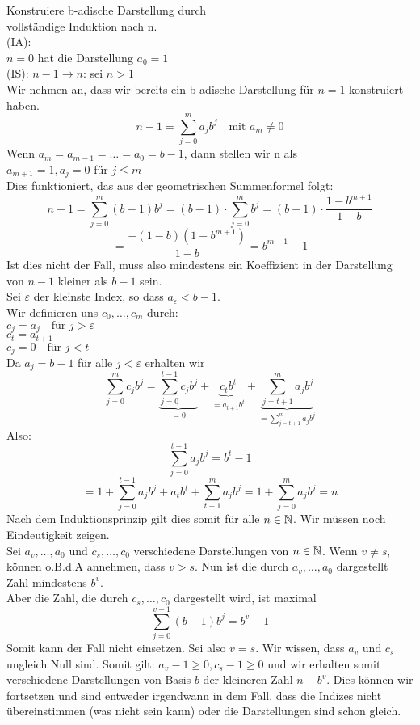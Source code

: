 \documentclass[../ana1u.tex]{subfiles}
\begin{document}
\begin{bew}
    Konstruiere b-adische Darstellung durch \\
    vollständige Induktion nach n. \\
    (IA):\\
    \(n = 0\) hat die Darstellung \(a_0 = 1 \) \\
    (IS): \(n - 1 \rightarrow n\): sei \(n > 1 \) \\
    Wir nehmen an, dass wir bereits ein b-adische Darstellung für \(n = 1 \) konstruiert haben.
    \[n-1 = \sum_{j=0}^{m} a_jb^j \quad \text{mit } a_m \neq 0 \]
    Wenn \(a_m = a_{m-1} = \dots = a_0 = b-1\), dann stellen wir n als \\
    \(a_{m+1} = 1, a_j = 0\) für \(j \leq m \) \\
    Dies funktioniert, das aus der geometrischen Summenformel folgt:
    \[n-1 = \sum_{j=0}^{m} (b-1)b^j = (b-1) \cdot \sum_{j=0}^{m}b^j = (b-1) 
    \cdot \frac{1- b^{m+1}}{1-b} \]
    \[= \frac{-(1-b)(1-b^{m+1})}{1-b} = b^{m+1}-1 \]
    Ist dies nicht der Fall, muss also mindestens ein Koeffizient in der Darstellung von 
    \(n-1\) kleiner als \(b-1\) sein. \\
    Sei \(\varepsilon\) der kleinste Index, so dass \(a_{\varepsilon} < b-1\). \\
    Wir definieren uns \(c_0, \dots, c_m \) durch: \\
    \(c_j = a_j \quad \text{für } j > \varepsilon \) \\
    \(c_t = a_{t+1}\) \\
    \(c_j = 0 \quad \text{für } j < t\) \\
    Da \(a_j = b-1\) für alle \(j<\varepsilon\) erhalten wir
    \[\sum_{j=0}^{m} c_jb^j = \underbrace{\sum_{j=0}^{t-1} c_jb^j}_{=0} 
    + \underbrace{c_tb^t}_{=a_{t+1}b^t} + 
    \underbrace{\sum_{j=t+1}^{m} a_jb^j}_{=\sum_{j=t+1}^{m} a_jb^j} \]
    Also:
    \[\sum_{j=0}^{t-1} a_jb^j = b^t-1 \]
    \[= 1+\sum_{j=0}^{t-1} a_jb^j + a_tb^t + \sum_{t+1}^{m}a_jb^j 
    = 1+\sum_{j=0}^{m} a_jb^j = n \]
    Nach dem Induktionsprinzip gilt dies somit für alle \(n \in \mathbb{N} \). Wir müssen noch 
    Eindeutigkeit zeigen. \\
    Sei \(a_v,\dots, a_0 \) und \(c_s,\dots, c_0 \) verschiedene Darstellungen von 
    \(n \in \mathbb{N} \). 
    Wenn \(v \neq s \), können o.B.d.A annehmen, dass \(v > s\). Nun ist die durch 
    \(a_v,\dots, a_0 \) dargestellt Zahl mindestens \(b^v \). \\
    Aber die Zahl, die durch \(c_s,\dots, c_0\) dargestellt wird, ist maximal
    \[\sum_{j=0}^{v-1}(b-1)b^j = b^v - 1\]
    Somit kann der Fall nicht einsetzen. Sei also \(v=s\). Wir wissen, dass \(a_v\) und 
    \(c_s\) ungleich Null sind. Somit gilt: \(a_v - 1 \geq 0, c_s - 1 \geq 0\) und wir 
    erhalten somit verschiedene Darstellungen von Basis \(b\) der kleineren Zahl \(n-b^v\). 
    Dies können wir fortsetzen und sind entweder irgendwann in dem Fall, dass die Indizes 
    nicht übereinstimmen (was nicht sein kann) oder die Darstellungen sind schon gleich.
\end{bew}
\end{document}
